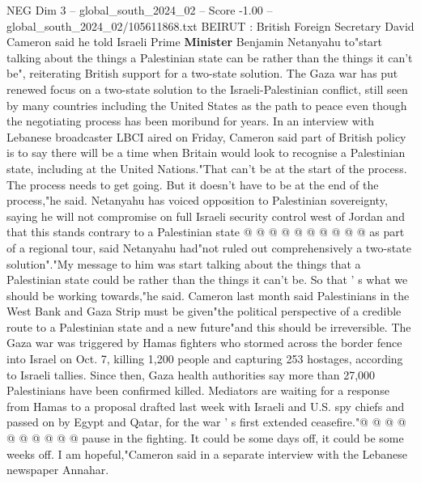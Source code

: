 \begin{textsample}{NEG Dim 3 – global\_south\_2024\_02 – Score -1.00 – global\_south\_2024\_02/105611868.txt}  \label{ex:f3_neg_083}
BEIRUT : British Foreign Secretary David Cameron said he told Israeli Prime \textbf{Minister} Benjamin Netanyahu to"start talking about the things a Palestinian state can be rather than the things it can't be", reiterating British support for a two-state solution.
The Gaza war has put renewed focus on a two-state solution to the Israeli-Palestinian conflict, still seen by many countries including the United States as the path to peace even though the negotiating process has been moribund for years.
In an interview with Lebanese broadcaster LBCI aired on Friday, Cameron said part of British policy is to say there will be a time when Britain would look to recognise a Palestinian state, including at the United Nations."That can't be at the start of the process.
The process needs to get going.
But it doesn't have to be at the end of the process,"he said.
Netanyahu has voiced opposition to Palestinian sovereignty, saying he will not compromise on full Israeli security control west of Jordan and that this stands contrary to a Palestinian state @ @ @ @ @ @ @ @ @ @ as part of a regional tour, said Netanyahu had"not ruled out comprehensively a two-state solution"."My message to him was start talking about the things that a Palestinian state could be rather than the things it can't be.
So that ' s what we should be working towards,"he said.
Cameron last month said Palestinians in the West Bank and Gaza Strip must be given"the political perspective of a credible route to a Palestinian state and a new future"and this should be irreversible.
The Gaza war was triggered by Hamas fighters who stormed across the border fence into Israel on Oct. 7, killing 1,200 people and capturing 253 hostages, according to Israeli tallies.
Since then, Gaza health authorities say more than 27,000 Palestinians have been confirmed killed.
Mediators are waiting for a response from Hamas to a proposal drafted last week with Israeli and U.S. spy chiefs and passed on by Egypt and Qatar, for the war ' s first extended ceasefire."@ @ @ @ @ @ @ @ @ @ pause in the fighting.
It could be some days off, it could be some weeks off.
I am hopeful,"Cameron said in a separate interview with the Lebanese newspaper Annahar.

\end{textsample}
